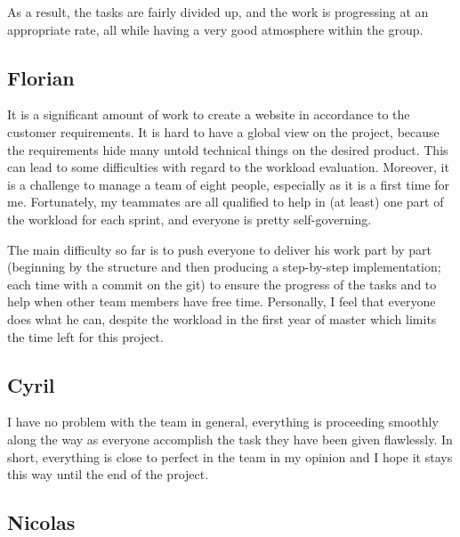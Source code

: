 As a result, the tasks are fairly divided up, and the work is progressing at an appropriate rate, all while having a very good atmosphere within the group.

\subsection{Florian}
It is a significant amount of work to create a website in accordance to the customer requirements. It is hard to have a global view on the project, because the requirements hide many untold technical things on the desired product. This can lead to some difficulties with regard to the workload evaluation. Moreover, it is a challenge to manage a team of eight people, especially as it is a first time for me. Fortunately, my
teammates are all qualified to help in (at least) one part of the workload for
each sprint, and everyone is pretty self-governing. \newline

The main difficulty so far is to push everyone to deliver his work part by
part (beginning by the structure and then producing a step-by-step
implementation; each time with a commit on the git) to ensure the progress
of the tasks and to help when other team members have free time.
Personally, I feel that everyone does what he can, despite the workload in
the first year of master which limits the time left for this project.\newline
\subsection{Cyril}

I have no problem with the team in general, everything is proceeding
smoothly along the way as everyone accomplish the task they have been given
flawlessly. In short, everything is close to perfect in the team in my
opinion and I hope it stays this way until the end of the project.
\subsection{Nicolas}
